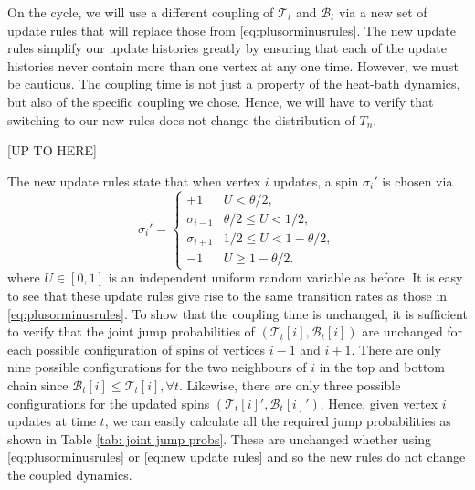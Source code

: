 	On the cycle, we will use a different coupling of $\mathscr{T}_t$ and $\mathscr{B}_t$ via a new set of update rules that will replace those from \eqref{eq:plusorminusrules}. The new update rules simplify our update histories greatly by ensuring that each of the update histories never contain more than one vertex at any one time. However, we must be cautious. The coupling time is not just a property of the heat-bath dynamics, but also of the specific coupling we chose. Hence, we will have to verify that switching to our new rules does not change the distribution of $T_n$. 

	[UP TO HERE]

	The new update rules state that when vertex $i$ updates, a spin $\sigma_i'$ is chosen via
	\begin{equation}
	\label{eq:new update rules}
		\sigma_i' = \begin{cases}
			+1 & U < \theta/2,\\
			\sigma_{i-1} & \theta/2 \leq U < 1/2,\\
			\sigma_{i+1} & 1/2 \leq U < 1 - \theta/2,\\
			-1 & U \geq 1 - \theta/2.
		\end{cases}
	\end{equation}
	where $U \in [0,1]$ is an independent uniform random variable as before. It is easy to see that these update rules give rise to the same transition rates as those in \eqref{eq:plusorminusrules}. To show that the coupling time is unchanged, it is sufficient to verify that the joint jump probabilities of $(\mathscr{T}_t[i], \mathscr{B}_t[i])$ are unchanged for each possible configuration of spins of vertices $i-1$ and $i+1$. There are only nine possible configurations for the two neighbours of $i$ in the top and bottom chain since $\mathscr{B}_t[i] \leq \mathscr{T}_t[i], \forall t$. Likewise, there are only three possible configurations for the updated spins $(\mathscr{T}_t[i]', \mathscr{B}_t[i]')$. Hence, given vertex $i$ updates at time $t$, we can easily calculate all the required jump probabilities as shown in Table \ref{tab: joint jump probs}. These are unchanged whether using \eqref{eq:plusorminusrules} or \eqref{eq:new update rules} and so the new rules do not change the coupled dynamics.

